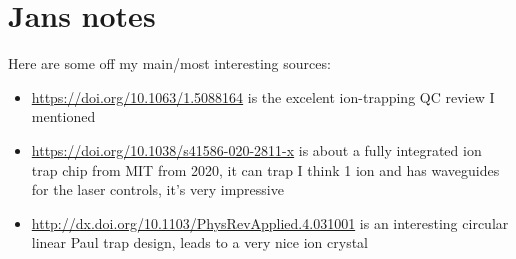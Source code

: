 \section{Jans notes}
Here are some off my main/most interesting sources:
\begin{itemize}
    \item \url{https://doi.org/10.1063/1.5088164} is the excelent ion-trapping QC review I mentioned
    \item \url{https://doi.org/10.1038/s41586-020-2811-x} is about a fully integrated ion trap chip from MIT from 2020, it can trap I think 1 ion and has waveguides for the laser controls, it's very impressive
    \item \url{http://dx.doi.org/10.1103/PhysRevApplied.4.031001} is an interesting circular linear Paul trap design, leads to a very nice ion crystal
\end{itemize}


